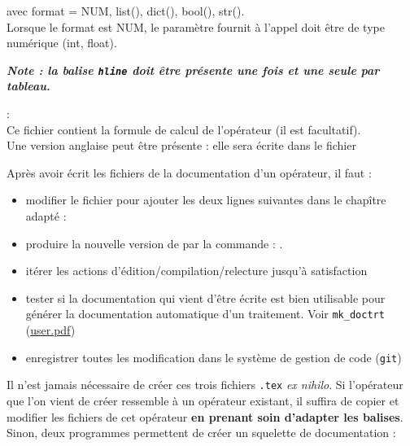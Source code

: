 \begin{description}
    avec format = NUM, list(), dict(), bool(), str(). \\
    Lorsque le format est NUM, le paramètre fournit à l'appel doit être de
    type numérique (int, float).

    \textbf{\textit{Note : la balise \texttt{hline} doit être présente une
                    fois et une seule par tableau.}} \\

  \item[{\path{formules/Mon_Oper.frm.tex}}] : \\
    Ce fichier contient la formule de calcul de l'opérateur (il est
    facultatif). \\
    Une version anglaise peut être présente : elle sera écrite dans le fichier
\end{description}



  Après avoir écrit les fichiers de la documentation d'un opérateur, il faut :

  \begin{itemize}
    \item[•] modifier le fichier  pour ajouter les deux
      lignes suivantes dans le chapître adapté : \\
      \begin{boxedverbatim}

\newpage \end{boxedverbatim}

    \item[•] produire la nouvelle version de  par la
        commande : .

    \item[•] itérer les actions d'édition/compilation/relecture jusqu'à
      satisfaction

    \item[•] tester si la documentation qui vient d'être écrite est bien
      utilisable pour générer la documentation automatique d'un traitement.
      Voir \texttt{mk\_doctrt} (\url{user.pdf})

    \item[•] enregistrer toutes les modification dans le système de gestion de
      code (\texttt{git})
  \end{itemize}

\medbreak
  Il n'est jamais nécessaire de créer ces trois fichiers \texttt{.tex}
\textit{ex nihilo}. Si l'opérateur que l'on vient de créer ressemble à un
opérateur existant, il suffira de copier et modifier les fichiers de cet
opérateur \textbf{en prenant soin d'adapter les balises}. Sinon, deux
programmes permettent de créer un squelette de documentation :

